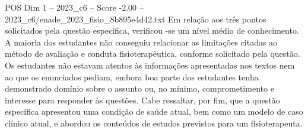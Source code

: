 \begin{textsample}{POS Dim 1 – 2023\_c6 – Score -2.00 – 2023\_c6/enade\_2023\_fisio\_8b895e4d42.txt}
Em relação aos três pontos solicitados pela questão específica, verificou -se um nível médio de conhecimento.
A maioria dos estudantes não conseguiu relacionar as limitações citadas ao método de avaliação e conduta fisioterapêutica, conforme solicitado pela questão.
Os estudantes não estavam atentos às informações apresentadas nos textos nem ao que os enunciados pediam, embora boa parte dos estudantes tenha demonstrado domínio sobre o assunto ou, no mínimo, comprometimento e interesse para responder às questões.
Cabe ressaltar, por fim, que a questão específica apresentou uma condição de saúde atual, bem como um modelo de caso clínico atual, e abordou os conteúdos de estudos previstos para um fisioterapeuta.

\end{textsample}
